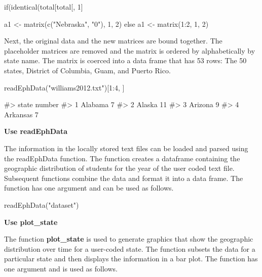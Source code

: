 \begin{Schunk}
\begin{Sinput}
if(identical(total[total[, 1] %in% c("Nebraska", "Nebraska\t"), 1], character(0)))
\end{Sinput}
\end{Schunk}\begin{Schunk}
\begin{Sinput}
{ a1 <- matrix(c("Nebraska", "0"), 1, 2) } else { a1 <- matrix(1:2, 1, 2) }
\end{Sinput}
\end{Schunk}

Next, the original data and the new matrices are bound together. The
placeholder matrices are removed and the matrix is ordered by
alphabetically by state name. The matrix is coerced into a data frame
that has 53 rows: The 50 states, District of Columbia, Guam, and Puerto
Rico.

\begin{Schunk}
\begin{Sinput}
readEphData("williams2012.txt")[1:4, ]
\end{Sinput}
\begin{Soutput}
#>      state number
#> 1  Alabama      7
#> 2   Alaska     11
#> 3  Arizona      9
#> 4 Arkansas      7
\end{Soutput}
\end{Schunk}

\textbf{Use readEphData}

The information in the locally stored text files can be loaded and
parsed using the readEphData function. The function creates a dataframe
containing the geographic distribution of students for the year of the
user coded text file. Subsequent functions combine the data and format
it into a data frame. The function has one argument and can be used as
follows.

\begin{Schunk}
\begin{Sinput}
readEphData("dataset")
\end{Sinput}
\end{Schunk}

\textbf{Use plot\_state}

The function \textbf{plot\_state} is used to generate graphics that show
the geographic distribution over time for a user-coded state. The
function subsets the data for a particular state and then displays the
information in a bar plot. The function has one argument and is used as
follows.

